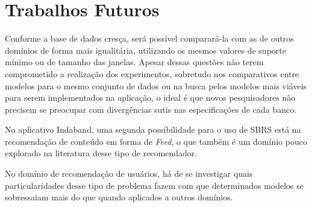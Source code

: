 \section{Trabalhos Futuros}
Conforme a base de dados cresça, será possível comparará-la com as de outros
domínios de forma mais igualitária, utilizando os mesmos valores de suporte
mínimo ou de tamanho das janelas. Apesar dessas questões não terem comprometido
a realização dos experimentos, sobretudo nos comparativos entre modelos para
o mesmo conjunto de dados ou na busca pelos modelos mais viáveis para serem
implementados na aplicação, o ideal é que novos pesquisadores não precisem
se preocupar com divergências sutis nas especificações de cada banco.

No aplicativo Indaband, uma segunda possibilidade para o uso de SBRS
está na recomendação de conteúdo em forma de \textit{Feed}, o que também
é um domínio pouco explorado na literatura desse tipo de recomendador.

No domínio de recomendação de usuários, há de se investigar quais
particularidades desse tipo de problema fazem com que determinados modelos
se sobressaiam mais do que quando aplicados a outros domínios.